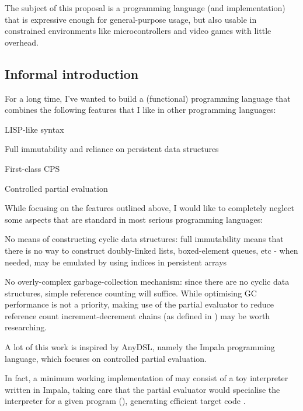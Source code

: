 \documentclass[main.tex]{subfiles}
\begin{document}
The subject of this proposal is a programming language (and implementation)
that is expressive enough for general-purpose usage, but also usable
in constrained environments like microcontrollers and video games with little
overhead.

\subsection{Informal introduction}

For a long time, I've wanted to build a (functional) programming language that
combines the following features that I like in other programming languages:

\begin{mitemize}
\item LISP-like syntax
\item Full immutability and reliance on persistent data structures
\item First-class CPS
\item Controlled partial evaluation
\end{mitemize}

While focusing on the features outlined above, I would like to completely
neglect some aspects that are standard in most serious programming languages:

\begin{mitemize}

\item {}No means of
constructing cyclic data structures: full immutability means that there is no
way to construct doubly-linked lists, boxed-element queues, etc - when needed,
 may be emulated by using indices in persistent arrays

\item No overly-complex garbage-collection mechanism: since there are no
cyclic data structures, simple reference counting will suffice. While
optimising GC performance is not a priority, making use of the partial
evaluator to reduce reference count increment-decrement chains
(as defined in \cite{ms}) may be worth researching.

\end{mitemize}

A lot of this work is inspired by AnyDSL\cite{anydsl}, namely the Impala
programming language, which focuses on controlled partial evaluation.

In fact, a minimum working implementation of  may consist
of a toy interpreter written in Impala, taking care that the partial evaluator
would specialise the interpreter for a given program (), generating efficient target code .
\end{document}

